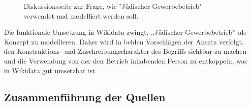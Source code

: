 \begin{figure}[h]
    \centering
    \caption{Diskussionsseite zur Frage, wie "Jüdischer Gewerbebetrieb" verwendet und modelliert werden soll.}
    \label{fig:x cubed graph}
\end{figure}

Die funktionale Umsetzung in Wikidata zwingt, ,,Jüdischer Gewerbebetrieb'' als Konzept zu modellieren. Daher wird in beiden Vorschlägen der Ansatz verfolgt, den Konstruktions- und Zuschreibungscharakter des Begriffs sichtbar zu machen und die Verwendung von der den Betrieb inhabenden Person zu entkoppeln, was in Wikidata gut umsetzbar ist. 

\subsection{Zusammenführung der Quellen}

